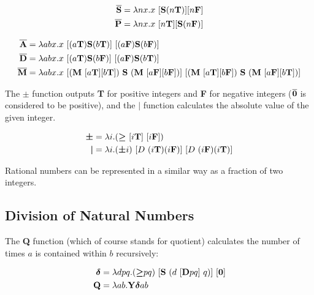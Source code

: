 \documentclass[Master.tex]{subfiles}
\begin{document}
\begin{gather*}
\begin{aligned}
\overline{\bm{\mathrm{S}}} &= \lambda nx.x\ [\bm{\mathrm{S}}(n\bm{\mathrm{T}})][n\bm{\mathrm{F}}] \\
\overline{\bm{\mathrm{P}}} &= \lambda nx.x\ [n\bm{\mathrm{T}}][\bm{\mathrm{S}}(n\bm{\mathrm{F}})]
\end{aligned}    
\end{gather*}

\begin{gather*}
\begin{aligned}
\lvari{A} &= \lambda abx.x\ [(a\lvar{T})\lvar{S}(b\lvar{T})]\ [(a\lvar{F})\lvar{S}(b\lvar{F})] \\
\lvari{D} &= \lambda abx.x\ [(a\lvar{T})\lvar{S}(b\lvar{F})]\ [(a\lvar{F})\lvar{S}(b\lvar{T})] \\
\lvari{M} &= \lambda abx.x\ [(\lvar{M}\ [a\lvar{T}][b\lvar{T}])\ \lvar{S}\ (\lvar{M}\ [a\lvar{F}][b\lvar{F}])]\ [(\lvar{M}\ [a\lvar{T}][b\lvar{F}])\ \lvar{S}\ (\lvar{M}\ [a\lvar{F}][b\lvar{T}])] \\
\end{aligned}    
\end{gather*}

The \textbf{$\pm$} function outputs \textbf{T} for positive integers and \textbf{F} for negative integers ($\overline{\bm{\mathrm{0}}}$ is considered to be positive), and the \textbf{$|$} function calculates the absolute value of the given integer.

\begin{gather*}
\begin{aligned}
\lvar{\pm} &= \lambda i.(\lvar{\geq}\ [i\lvar{T}]\ [i\lvar{F}]) \\
\lvar{|} &= \lambda i. (\lvar{\pm}i)\ [D\ (i\lvar{T}) (i\lvar{F})]\ [D\ (i\lvar{F}) (i\lvar{T})]
\end{aligned}    
\end{gather*}

Rational numbers can be represented in a similar way as a fraction of two integers.

\subsection{Division of Natural Numbers}

The \textbf{Q} function (which of course stands for quotient) calculates the number of times $a$ is contained within $b$ recursively: \cite{allisonWEB17integers}

\begin{gather*}
\begin{aligned}
\lvar{\delta} &= \lambda dpq.(\lvar{\geq}pq)\ [\lvar{S}\ (d\ [\lvar{D}pq]\ q)]\ [\lvar{0}] \\
\lvar{Q} &= \lambda ab.\lvar{Y\delta}ab
\end{aligned}    
\end{gather*}
\end{document}
